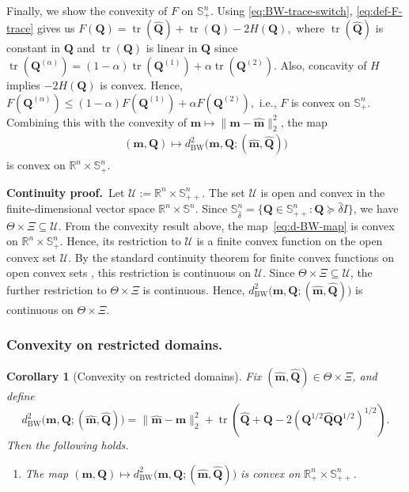 \documentclass[opre,sglanonrev]{informs4}
\newtheorem{corollary}{Corollary}
\newcommand{\mbR}{\mathbb R}
\newcommand{\mbS}{\mathbb S}
\newcommand{\bmean}{\bm{m}}
\newcommand{\bQ}{\bm Q}
\newcommand{\Tr}{\operatorname{tr}}
\begin{document}
{\begin{APPENDICES}
Finally, we show the convexity of \(F\) on \(\mbS^n_+\). Using \eqref{eq:BW-trace-switch}, \eqref{eq:def-F-trace} gives us $F(\bQ)=\Tr(\hat{\bQ})+\Tr(\bQ)-2H(\bQ),$
where \(\Tr(\hat{\bQ})\) is constant in \(\bQ\) and \(\Tr(\bQ)\) is linear in
\(\bQ\) since $\Tr(\bQ^{(\alpha)})
=
(1-\alpha)\Tr(\bQ^{(1)})+\alpha\Tr(\bQ^{(2)})$.
Also, concavity of \(H\) implies \(-2H(\bQ)\) is convex. Hence, $F(\bQ^{(\alpha)})
\le
(1-\alpha)F(\bQ^{(1)})+\alpha F(\bQ^{(2)}),$
i.e., \(F\) is convex on \(\mbS^n_+\). Combining this with the convexity of
\(\bmean\mapsto\|\bmean-\hat{\bmean}\|_2^2\), the map
\begin{align}\label{eq:d-BW-map}
    (\bmean,\bQ)\mapsto
d^2_{\mathrm{BW}}\bigl(\bmean,\bQ;(\hat{\bmean},\hat{\bQ})\bigr)
\end{align}
is convex on \(\mbR^n\times\mbS^n_+\).


\noindent\textbf{Continuity proof.}\, Let $\mathcal U:=\mbR^n\times\mbS^n_{++}$. The set \(\mathcal U\) is open and convex in the finite-dimensional vector space
\(\mbR^n\times\mbS^n\). Since $\mbS^n_{\hat\delta}
=
\{\bQ\in\mbS^n_{++}:\bQ\succeq \hat\delta I\}$, we have $\Theta\times\Xi\subseteq \mathcal U$. From the convexity result above, the map~\eqref{eq:d-BW-map} is convex on \(\mbR^n\times\mbS^n_+\). Hence, its restriction to
\(\mathcal U\) is a finite convex function on the open convex set \(\mathcal U\).
By the standard continuity theorem for finite convex functions on open convex
sets \cite[Corollary~2.36]{rockafellar2009variational}, this restriction is
continuous on \(\mathcal U\). Since \(\Theta\times\Xi\subseteq\mathcal U\), the further restriction to
\(\Theta\times\Xi\) is continuous. Hence, $d^2_{\mathrm{BW}}\bigl(\bmean,\bQ;(\hat{\bmean},\hat{\bQ})\bigr)$ is continuous on \(\Theta\times\Xi\).



\subsubsection{Convexity on restricted domains. }
\begin{corollary}[Convexity on restricted domains]
\label{cor:Delta-convex-restricted-domains}
Fix \((\hat{\bmean},\hat{\bQ})\in\Theta\times\Xi\), and define
\[
d^2_{\mathrm{BW}}\bigl(\bmean,\bQ;(\hat{\bmean},\hat{\bQ})\bigr)
=
\|\hat{\bmean}-\bmean\|_2^2
+
\Tr\!\left(
\hat{\bQ}+\bQ
-2(\bQ^{1/2}\hat{\bQ}\bQ^{1/2})^{1/2}
\right).
\]
Then the following holds.
\begin{enumerate}[label=\textit{\roman*)},leftmargin=1.5em]
\item The map $(\bmean,\bQ)\mapsto
d^2_{\mathrm{BW}}\bigl(\bmean,\bQ;(\hat{\bmean},\hat{\bQ})\bigr)$ is convex on \(\mbR^n_+\times\mbS^n_{++}\).


\end{enumerate}
\end{corollary}
\end{APPENDICES}}
\end{document}

